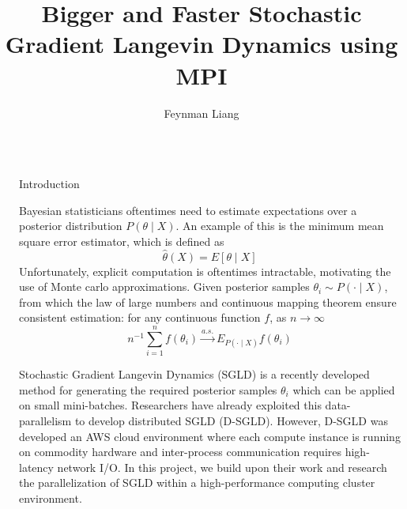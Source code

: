 \documentclass[final]{beamer}
\title{Bigger and Faster Stochastic Gradient Langevin Dynamics using MPI} %
\author{Feynman Liang} %
\institute{CS 267, UC Berkeley} %
\newlength{\sepwid}
\newlength{\onecolwid}
\begin{document}

\setlength{\belowcaptionskip}{2ex} %
\setlength\belowdisplayshortskip{2ex} %

\begin{frame}[t] %

\begin{columns}[t] %

\begin{column}{\sepwid}\end{column} %

\begin{column}{\onecolwid} %



\begin{block}{Introduction}

  Bayesian statisticians oftentimes need to estimate expectations over a
  posterior distribution $P(\theta \mid X)$. An example of this is the
  minimum mean square error estimator, which is defined as
  $$\hat\theta(X) = E[\theta \mid X]$$
  Unfortunately, explicit computation is oftentimes intractable,
  motivating the use of Monte carlo approximations.
  Given posterior samples $\theta_i \sim P(\cdot \mid X)$,
  from which the law of large numbers and continuous mapping theorem ensure consistent estimation:
  for any continuous function $f$, as $n \to \infty$
  $$n^{-1} \sum_{i=1}^n f(\theta_i) \overset{a.s.}{\to} E_{P(\cdot \mid X)} f(\theta_i)$$

  Stochastic Gradient Langevin Dynamics (SGLD) \citep{welling2011bayesian} is a
  recently developed method for generating the required posterior samples $\theta_i$
  which can be applied on small mini-batches. Researchers \citep{ahn2014distributed}
  have already exploited this data-parallelism to develop distributed SGLD (D-SGLD).
  However, D-SGLD was developed an AWS cloud environment where each compute
  instance is running on commodity hardware and inter-process communication
  requires high-latency network I/O. In this project, we build upon their work
  and research the parallelization of SGLD within a high-performance computing
  cluster environment.
\end{block}


\end{column}
\end{columns}
\end{frame}
\end{document}
